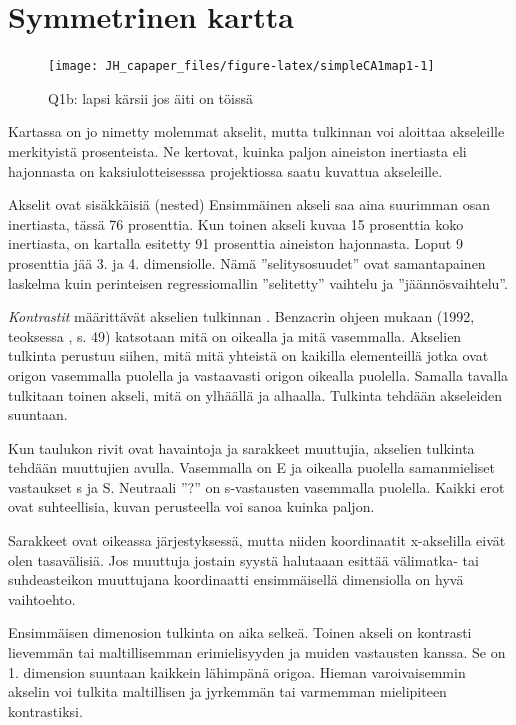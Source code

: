 \documentclass[
  finnish,
]{book}
\begin{document}
\hypertarget{symmetrinen-kartta}{%
\section{Symmetrinen kartta}\label{symmetrinen-kartta}}

\begin{figure}

{\centering \texttt{[image: JH\_capaper\_files/figure-latex/simpleCA1map1-1]} 

}

\caption{Q1b: lapsi kärsii jos äiti on töissä}\label{fig:simpleCA1map1}
\end{figure}

Kartassa on jo nimetty molemmat akselit, mutta tulkinnan voi aloittaa
akseleille merkityistä prosenteista. Ne kertovat, kuinka paljon aineiston
inertiasta eli hajonnasta on kaksiulotteisesssa projektiossa saatu kuvattua
akseleille.

Akselit ovat sisäkkäisiä (nested) Ensimmäinen akseli saa aina suurimman osan
inertiasta, tässä 76 prosenttia. Kun toinen akseli kuvaa 15 prosenttia koko inertiasta,
on kartalla esitetty 91 prosenttia aineiston hajonnasta. Loput 9 prosenttia jää
3. ja 4. dimensiolle. Nämä ''selitysosuudet'' ovat samantapainen laskelma kuin
perinteisen regressiomallin ''selitetty'' vaihtelu ja ''jäännösvaihtelu''.

\emph{Kontrastit} määrittävät akselien tulkinnan . Benzacrin ohjeen mukaan (1992,
teoksessa \citep{RefWorks:doc:5a857a43e4b0ed2d44664d75}, s. 49) katsotaan mitä on
oikealla ja mitä vasemmalla. Akselien tulkinta perustuu siihen, mitä mitä yhteistä
on kaikilla elementeillä jotka ovat origon vasemmalla puolella ja vastaavasti
origon oikealla puolella. Samalla tavalla tulkitaan toinen akseli, mitä on
ylhäällä ja alhaalla. Tulkinta tehdään akseleiden suuntaan.

Kun taulukon rivit ovat havaintoja ja sarakkeet muuttujia, akselien tulkinta
tehdään muuttujien avulla. Vasemmalla on E ja oikealla puolella samanmieliset
vastaukset s ja S. Neutraali ''?'' on s-vastausten vasemmalla puolella.
Kaikki erot ovat suhteellisia, kuvan perusteella voi sanoa kuinka paljon.

Sarakkeet ovat oikeassa järjestyksessä, mutta niiden koordinaatit
x-akselilla eivät olen tasavälisiä. Jos muuttuja jostain syystä halutaaan
esittää välimatka- tai suhdeasteikon muuttujana koordinaatti ensimmäisellä
dimensiolla on hyvä vaihtoehto.

Ensimmäisen dimenosion tulkinta on aika selkeä. Toinen akseli on kontrasti
lievemmän tai maltillisemman erimielisyyden ja muiden vastausten kanssa.
Se on 1. dimension suuntaan kaikkein lähimpänä origoa. Hieman varoivaisemmin
akselin voi tulkita maltillisen ja jyrkemmän tai varmemman mielipiteen kontrastiksi.
\end{document}
